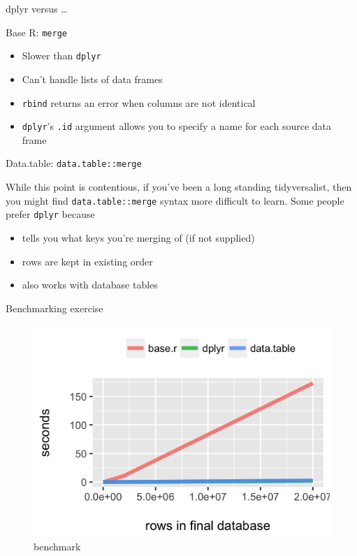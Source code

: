\documentclass[ignorenonframetext,]{beamer}
\providecommand{\tightlist}{%
  \setlength{\itemsep}{0pt}\setlength{\parskip}{0pt}}
\begin{document}
\begin{frame}[fragile]{dplyr versus \ldots{}}

\begin{block}{Base R: \texttt{merge}}

\begin{itemize}
\tightlist
\item
  Slower than \texttt{dplyr}
\item
  Can't handle lists of data frames
\item
  \texttt{rbind} returns an error when columns are not identical
\item
  \texttt{dplyr}'s \texttt{.id} argument allows you to specify a name
  for each source data frame
\end{itemize}

\end{block}

\begin{block}{Data.table: \texttt{data.table::merge}}

While this point is contentious, if you've been a long standing
tidyversalist, then you might find \texttt{data.table::merge} syntax
more difficult to learn. Some people prefer \texttt{dplyr} because

\begin{itemize}
\tightlist
\item
  tells you what keys you're merging of (if not supplied)
\item
  rows are kept in existing order
\item
  also works with database tables
\end{itemize}

\end{block}

\end{frame}

\begin{frame}{Benchmarking exercise}

\begin{figure}
\centering
\includegraphics{graphs/benchmark.png}
\caption{benchmark}
\end{figure}

\end{frame}
\end{document}
